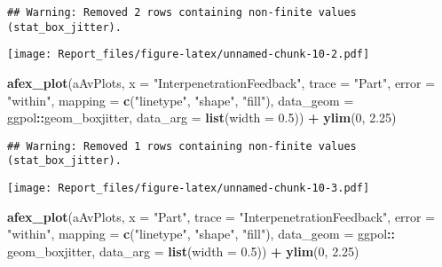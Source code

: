 \documentclass[
]{article}
\newenvironment{Shaded}{\begin{snugshade}}{\end{snugshade}}
\newcommand{\DataTypeTok}[1]{\textcolor[rgb]{0.13,0.29,0.53}{#1}}
\newcommand{\DecValTok}[1]{\textcolor[rgb]{0.00,0.00,0.81}{#1}}
\newcommand{\FloatTok}[1]{\textcolor[rgb]{0.00,0.00,0.81}{#1}}
\newcommand{\KeywordTok}[1]{\textcolor[rgb]{0.13,0.29,0.53}{\textbf{#1}}}
\newcommand{\NormalTok}[1]{#1}
\newcommand{\OperatorTok}[1]{\textcolor[rgb]{0.81,0.36,0.00}{\textbf{#1}}}
\newcommand{\StringTok}[1]{\textcolor[rgb]{0.31,0.60,0.02}{#1}}
\begin{document}
\begin{verbatim}
## Warning: Removed 2 rows containing non-finite values (stat_box_jitter).
\end{verbatim}

\texttt{[image: Report\_files/figure-latex/unnamed-chunk-10-2.pdf]}

\begin{Shaded}
\begin{Highlighting}[]
\KeywordTok{afex_plot}\NormalTok{(aAvPlots, }\DataTypeTok{x =} \StringTok{"InterpenetrationFeedback"}\NormalTok{,  }\DataTypeTok{trace =} \StringTok{"Part"}\NormalTok{, }\DataTypeTok{error =} \StringTok{"within"}\NormalTok{, }
                \DataTypeTok{mapping =} \KeywordTok{c}\NormalTok{(}\StringTok{"linetype"}\NormalTok{, }\StringTok{"shape"}\NormalTok{, }\StringTok{"fill"}\NormalTok{),}
                \DataTypeTok{data_geom =}\NormalTok{ ggpol}\OperatorTok{::}\NormalTok{geom_boxjitter, }
                \DataTypeTok{data_arg =} \KeywordTok{list}\NormalTok{(}\DataTypeTok{width =} \FloatTok{0.5}\NormalTok{)) }\OperatorTok{+}
\StringTok{            }\KeywordTok{ylim}\NormalTok{(}\DecValTok{0}\NormalTok{, }\FloatTok{2.25}\NormalTok{)}
\end{Highlighting}
\end{Shaded}

\begin{verbatim}
## Warning: Removed 1 rows containing non-finite values (stat_box_jitter).
\end{verbatim}

\texttt{[image: Report\_files/figure-latex/unnamed-chunk-10-3.pdf]}

\begin{Shaded}
\begin{Highlighting}[]
\KeywordTok{afex_plot}\NormalTok{(aAvPlots, }\DataTypeTok{x =} \StringTok{"Part"}\NormalTok{, }\DataTypeTok{trace =} \StringTok{"InterpenetrationFeedback"}\NormalTok{, }\DataTypeTok{error =} \StringTok{"within"}\NormalTok{, }
                \DataTypeTok{mapping =} \KeywordTok{c}\NormalTok{(}\StringTok{"linetype"}\NormalTok{, }\StringTok{"shape"}\NormalTok{, }\StringTok{"fill"}\NormalTok{),}
                \DataTypeTok{data_geom =}\NormalTok{ ggpol}\OperatorTok{::}\StringTok{ }\NormalTok{geom_boxjitter, }
                \DataTypeTok{data_arg =} \KeywordTok{list}\NormalTok{(}\DataTypeTok{width =} \FloatTok{0.5}\NormalTok{))  }\OperatorTok{+}
\StringTok{            }\KeywordTok{ylim}\NormalTok{(}\DecValTok{0}\NormalTok{, }\FloatTok{2.25}\NormalTok{)}
\end{Highlighting}
\end{Shaded}
\end{document}
